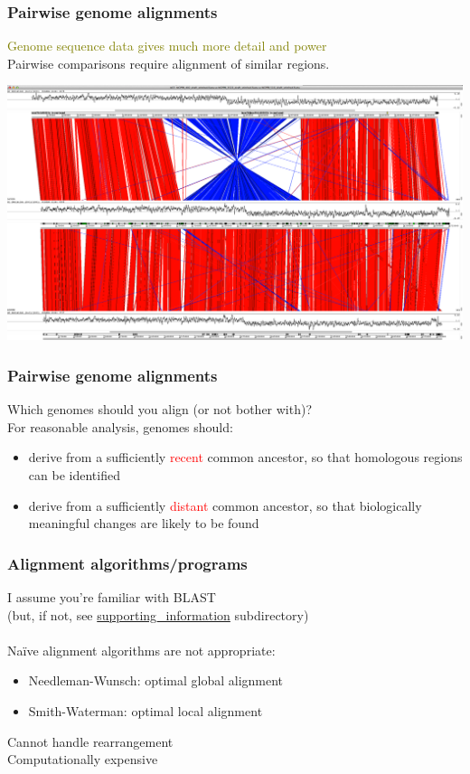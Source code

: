 
%
\begin{frame}
  \frametitle{Pairwise genome alignments}
  \textcolor{olive}{Genome sequence data gives much more detail and power} \\
  Pairwise comparisons require alignment of similar regions.
  \begin{center}
    \includegraphics[width=\textwidth]{images/pairwise_genome_alignment}
  \end{center}  
\end{frame}

%
\begin{frame}
  \frametitle{Pairwise genome alignments}
  \textcolor{hutton_green}{Which genomes should you align (or not bother with)?} \\
  \textcolor{RawSienna}{For reasonable analysis, genomes should}:
  \begin{itemize}
    \item derive from a sufficiently \textcolor{red}{recent} common ancestor, so that \textcolor{hutton_purple}{homologous regions can be identified}
    \item derive from a sufficiently \textcolor{red}{distant} common ancestor, so that \textcolor{hutton_purple}{biologically meaningful changes are likely to be found}
  \end{itemize}
\end{frame}

%
\begin{frame}
  \frametitle{Alignment algorithms/programs}
  \textcolor{hutton_green}{I assume you're familiar with BLAST} \\
  (but, if not, see \url{supporting_information} subdirectory) \\~\\
  \textcolor{RawSienna}{Na\"{i}ve alignment algorithms are not appropriate}:
  \begin{itemize}
    \item Needleman-Wunsch: optimal global alignment
    \item Smith-Waterman: optimal local alignment
  \end{itemize}
  \textcolor{hutton_blue}{Cannot handle rearrangement} \\
  \textcolor{hutton_purple}{Computationally expensive}  
\end{frame}

